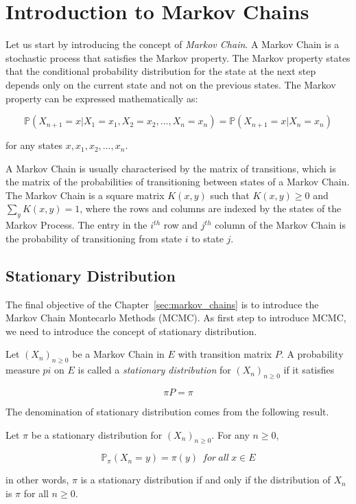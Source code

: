 \documentclass{report}
\begin{document}
\section{Introduction to Markov Chains}
\label{sec:introduction_markov_chains}

Let us start by introducing the concept of \textit{Markov Chain}. A Markov Chain is a stochastic process that satisfies the Markov property. The Markov property states that the conditional probability distribution for the state at the next step depends only on the current state and not on the previous states. The Markov property can be expressed mathematically as:

\[
	\mathbb{P}(X_{n+1} = x | X_1 = x_1, X_2 = x_2, \dots, X_n = x_n) = \mathbb{P}(X_{n+1} = x | X_n = x_n)
\]

for any states \(x, x_1, x_2, \dots, x_n\). 

A Markov Chain is usually characterised by the matrix of transitions, which is the matrix of the probabilities of transitioning between states of a Markov Chain. The Markov Chain is a square matrix $K(x,y)$ such that $K(x,y) \geq 0$ and \(\sum_{y} K(x,y) = 1\), where the rows and columns are indexed by the states of the Markov Process. The entry in the \(i^{th}\) row and \(j^{th}\) column of the Markov Chain is the probability of transitioning from state \(i\) to state \(j\).

\subsection{Stationary Distribution}
\label{sec:stationary_distribution}

The final objective of the Chapter~\ref{sec:markov_chains} is to introduce the Markov Chain Montecarlo Methods (MCMC). As first step to introduce MCMC, we need to introduce the concept of stationary distribution. 

\begin{definition}
	Let $(X_n)_{n \geq 0}$ be a Markov Chain in $E$ with transition matrix $P$. A probability measure $pi$ on $E$ is called a \textit{stationary distribution} for $(X_n)_{n \geq 0}$ if it satisfies 
	
	\[
		\pi P = \pi
	\]
\end{definition}

The denomination of stationary distribution comes from the following result.

\begin{proposition}
	Let $\pi$ be a stationary distribution for $(X_n)_{n \geq 0}$. For any \(n \geq 0\),

	\[
		\mathbb{P}_\pi(X_n = y) = \pi(y) \ \ for \ all \ x \in E
	\]

	in other words, $\pi$ is a stationary distribution if and only if the distribution of $X_n$ is $\pi$ for all $n \geq 0$.
\end{proposition}
\end{document}
